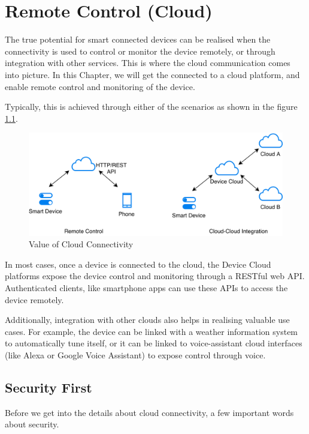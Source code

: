\documentclass[main.tex]{subfiles}
\begin{document}
\chapter{Remote Control (Cloud)}

The true potential for smart connected devices can be realised when the connectivity is used to control or monitor the device remotely, or through integration with other services. This is where the cloud communication comes into picture. In this Chapter, we will get the connected to a cloud platform, and enable remote control and monitoring of the device.

Typically, this is achieved through either of the scenarios as shown in the figure \ref{fig:cloud_connectivity}.

\begin{figure}
    \centering
    \includegraphics[scale=0.4]{../../_static/cloud_connectivity.png}
    \caption{Value of Cloud Connectivity}
    \label{fig:cloud_connectivity}
\end{figure}

In most cases, once a device is connected to the cloud, the Device Cloud platforms expose the device control and monitoring through a RESTful web API. Authenticated clients, like smartphone apps can use these APIs to access the device remotely.

Additionally, integration with other clouds also helps in realising valuable use cases. For example, the device can be linked with a weather information system to automatically tune itself, or it can be linked to voice-assistant cloud interfaces (like Alexa or Google Voice Assistant) to expose control through voice.

\section{Security First}\label{sec:security_first}
Before we get into the details about cloud connectivity, a few important words about security. 
\end{document}
